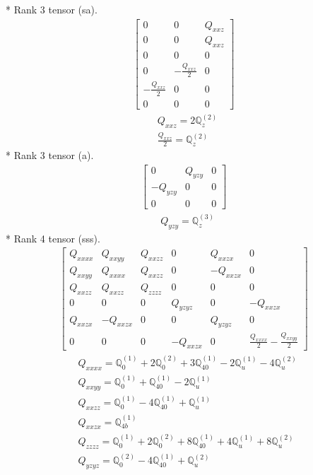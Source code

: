 \documentclass[fleqn,8pt,landscape]{jsarticle}
\begin{document}
* Rank 3 tensor (sa).
\begin{align*}
\begin{bmatrix} 0 & 0 & Q_{xxz} \\ 0 & 0 & Q_{xxz} \\ 0 & 0 & 0 \\ 0 & - \frac{Q_{xxz}}{2} & 0 \\ - \frac{Q_{xxz}}{2} & 0 & 0 \\ 0 & 0 & 0 \end{bmatrix}
\end{align*}
\begin{align*}
& Q_{xxz} = 2 \mathbb{Q}_{z}^{(2)} \\
& \frac{Q_{xxz}}{2} = \mathbb{Q}_{z}^{(2)}
\end{align*}
* Rank 3 tensor (a).
\begin{align*}
\begin{bmatrix} 0 & Q_{yzy} & 0 \\ - Q_{yzy} & 0 & 0 \\ 0 & 0 & 0 \end{bmatrix}
\end{align*}
\begin{align*}
& Q_{yzy} = \mathbb{Q}_{z}^{(3)}
\end{align*}
* Rank 4 tensor (sss).
\begin{align*}
\begin{bmatrix} Q_{xxxx} & Q_{xxyy} & Q_{xxzz} & 0 & Q_{xxzx} & 0 \\ Q_{xxyy} & Q_{xxxx} & Q_{xxzz} & 0 & - Q_{xxzx} & 0 \\ Q_{xxzz} & Q_{xxzz} & Q_{zzzz} & 0 & 0 & 0 \\ 0 & 0 & 0 & Q_{yzyz} & 0 & - Q_{xxzx} \\ Q_{xxzx} & - Q_{xxzx} & 0 & 0 & Q_{yzyz} & 0 \\ 0 & 0 & 0 & - Q_{xxzx} & 0 & \frac{Q_{xxxx}}{2} - \frac{Q_{xxyy}}{2} \end{bmatrix}
\end{align*}
\begin{align*}
& Q_{xxxx} = \mathbb{Q}_{0}^{(1)} + 2 \mathbb{Q}_{0}^{(2)} + 3 \mathbb{Q}_{40}^{(1)} - 2 \mathbb{Q}_{u}^{(1)} - 4 \mathbb{Q}_{u}^{(2)} \\
& Q_{xxyy} = \mathbb{Q}_{0}^{(1)} + \mathbb{Q}_{40}^{(1)} - 2 \mathbb{Q}_{u}^{(1)} \\
& Q_{xxzz} = \mathbb{Q}_{0}^{(1)} - 4 \mathbb{Q}_{40}^{(1)} + \mathbb{Q}_{u}^{(1)} \\
& Q_{xxzx} = \mathbb{Q}_{4b}^{(1)} \\
& Q_{zzzz} = \mathbb{Q}_{0}^{(1)} + 2 \mathbb{Q}_{0}^{(2)} + 8 \mathbb{Q}_{40}^{(1)} + 4 \mathbb{Q}_{u}^{(1)} + 8 \mathbb{Q}_{u}^{(2)} \\
& Q_{yzyz} = \mathbb{Q}_{0}^{(2)} - 4 \mathbb{Q}_{40}^{(1)} + \mathbb{Q}_{u}^{(2)}
\end{align*}
\end{document}
